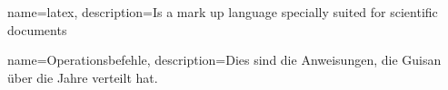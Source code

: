 \makeglossaries
 
{
    name=latex,
    description={Is a mark up language specially suited 
    for scientific documents}
}

{
    name=Operationsbefehle,
    description={Dies sind die Anweisungen, die Guisan über die Jahre verteilt hat.}
}